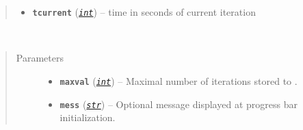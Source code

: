 \documentclass[a4paper,10pt,english]{sphinxmanual}
\begin{document}
\begin{fulllineitems}
\begin{quote}
\begin{description}
\begin{itemize}
\item {} 
\textbf{\texttt{tcurrent}} (\href{https://docs.python.org/2/library/functions.html\#int}{\emph{\texttt{int}}}) -- time in seconds of current iteration

\end{itemize}

\end{description}\end{quote}

\begin{fulllineitems}
\label{aqueduct.utils.clui:aqueduct.utils.clui.SimpleProgressBar.rotate}
\end{fulllineitems}


\begin{fulllineitems}
\label{aqueduct.utils.clui:aqueduct.utils.clui.SimpleProgressBar.barlenght}
\end{fulllineitems}


\begin{fulllineitems}
\label{aqueduct.utils.clui:aqueduct.utils.clui.SimpleProgressBar.__init__}~\begin{quote}\begin{description}
\item[{Parameters}] \leavevmode\begin{itemize}
\item {} 
\textbf{\texttt{maxval}} (\href{https://docs.python.org/2/library/functions.html\#int}{\emph{\texttt{int}}}) -- Maximal number of iterations stored to .

\item {} 
\textbf{\texttt{mess}} (\href{https://docs.python.org/2/library/functions.html\#str}{\emph{\texttt{str}}}) -- Optional message displayed at progress bar initialization.

\end{itemize}

\end{description}\end{quote}


\end{fulllineitems}
\end{fulllineitems}
\end{document}
